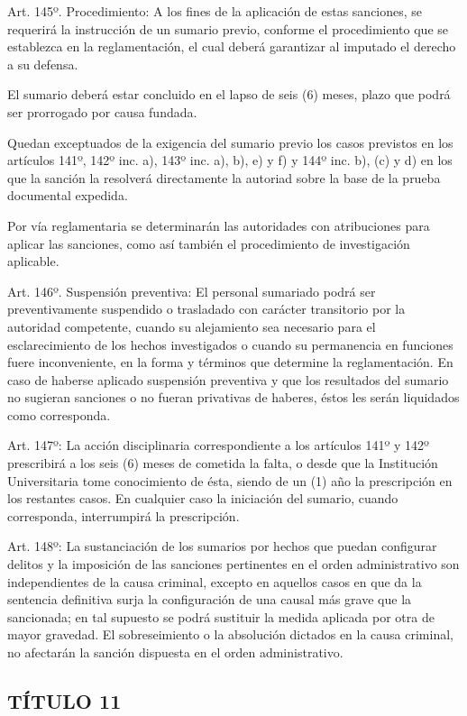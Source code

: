 \documentclass[]{article}
\begin{document}
Art. 145º. Procedimiento: A los fines de la aplicación de estas
sanciones, se requerirá la instrucción de un sumario previo, conforme el
procedimiento que se establezca en la reglamentación, el cual deberá
garantizar al imputado el derecho a su defensa.

El sumario deberá estar concluido en el lapso de seis (6) meses, plazo
que podrá ser prorrogado por causa fundada.

Quedan exceptuados de la exigencia del sumario previo los casos
previstos en los artículos 141º, 142º inc. a), 143º inc. a), b), e) y f)
y 144º inc. b), (c) y d) en los que la sanción la resolverá directamente
la autoriad sobre la base de la prueba documental expedida.

Por vía reglamentaria se determinarán las autoridades con atribuciones
para aplicar las sanciones, como así también el procedimiento de
investigación aplicable.

Art. 146º. Suspensión preventiva: El personal sumariado podrá ser
preventivamente suspendido o trasladado con carácter transitorio por la
autoridad competente, cuando su alejamiento sea necesario para el
esclarecimiento de los hechos investigados o cuando su permanencia en
funciones fuere inconveniente, en la forma y términos que determine la
reglamentación. En caso de haberse aplicado suspensión preventiva y que
los resultados del sumario no sugieran sanciones o no fueran privativas
de haberes, éstos les serán liquidados como corresponda.

Art. 147º: La acción disciplinaria correspondiente a los artículos 141º
y 142º prescribirá a los seis (6) meses de cometida la falta, o desde
que la Institución Universitaria tome conocimiento de ésta, siendo de un
(1) año la prescripción en los restantes casos. En cualquier caso la
iniciación del sumario, cuando corresponda, interrumpirá la
prescripción.

Art. 148º: La sustanciación de los sumarios por hechos que puedan
configurar delitos y la imposición de las sanciones pertinentes en el
orden administrativo son independientes de la causa criminal, excepto en
aquellos casos en que da la sentencia definitiva surja la configuración
de una causal más grave que la sancionada; en tal supuesto se podrá
sustituir la medida aplicada por otra de mayor gravedad. El
sobreseimiento o la absolución dictados en la causa criminal, no
afectarán la sanción dispuesta en el orden administrativo.

\subsection{TÍTULO 11}\label{tuxedtulo-11}
\end{document}
